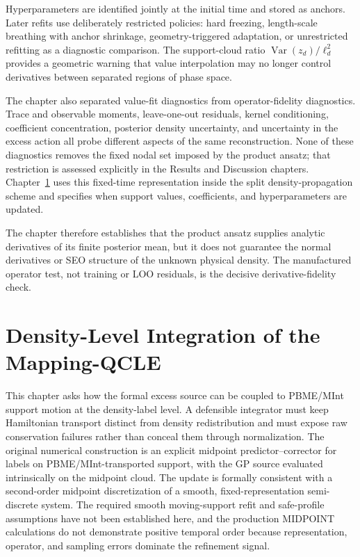 \documentclass[
  11pt,
  letterpaper,
  onehalfspacing,
  normalmargins,
  equalmargins,
  oneside
]{ut-thesis}
\begin{document}
Hyperparameters are identified jointly at the initial time and stored as
anchors. Later refits use deliberately restricted policies: hard freezing,
length-scale breathing with anchor shrinkage, geometry-triggered adaptation,
or unrestricted refitting as a diagnostic comparison. The support-cloud ratio
\(\operatorname{Var}(z_d)/\ell_d^2\) provides a geometric warning that value
interpolation may no longer control derivatives between separated regions of
phase space.

The chapter also separated value-fit diagnostics from operator-fidelity
diagnostics. Trace and observable moments, leave-one-out residuals, kernel
conditioning, coefficient concentration, posterior density uncertainty, and
uncertainty in the excess action all probe different aspects of the same
reconstruction. None of these diagnostics removes the fixed nodal set imposed
by the product ansatz; that restriction is assessed explicitly in the Results
and Discussion chapters. Chapter~\ref{chap:density-level-integration} uses this
fixed-time representation inside the split density-propagation scheme and
specifies when support values, coefficients, and hyperparameters are updated.

The chapter therefore establishes that the product ansatz supplies analytic derivatives of its finite posterior mean,
but it does not guarantee the normal derivatives or SEO structure of the
unknown physical density.  The manufactured operator test, not training or
LOO residuals, is the decisive derivative-fidelity check.

\chapter{Density-Level Integration of the Mapping-QCLE}
\label{chap:density-level-integration}

This chapter asks how the formal excess source can be coupled to PBME/MInt
support motion at the density-label level.  A defensible integrator must keep
Hamiltonian transport distinct from density redistribution and must expose raw
conservation failures rather than conceal them through normalization.  The
original numerical construction is an explicit midpoint
predictor--corrector for labels on PBME/MInt-transported support, with the GP
source evaluated intrinsically on the midpoint cloud.  The update is formally
consistent with a second-order midpoint discretization of a smooth,
fixed-representation semi-discrete system. The required smooth moving-support
refit and safe-profile assumptions have not been established here, and the
production MIDPOINT calculations do not demonstrate positive
temporal order because representation, operator, and sampling errors dominate
the refinement signal.
\end{document}
